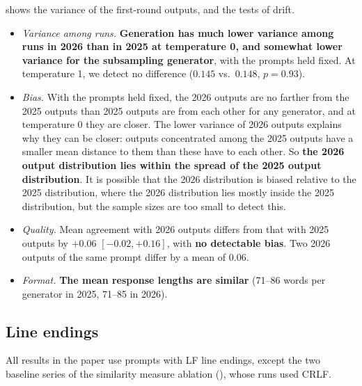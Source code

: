 \documentclass[letterpaper]{article} %
\begin{document}
 shows the variance of the first-round outputs, and  the tests of drift.
\begin{itemize}
    \item \emph{Variance among runs.}
    \textbf{Generation has much lower variance among runs in 2026 than in 2025 at temperature 0, and somewhat lower variance for the subsampling generator}, with the prompts held fixed.
    At temperature 1, we detect no difference (\(0.145\) vs.\ \(0.148\), \(p = 0.93\)).
    \item \emph{Bias.}
    With the prompts held fixed, the 2026 outputs are no farther from the 2025 outputs than 2025 outputs are from each other for any generator, and at temperature 0 they are closer.
    The lower variance of 2026 outputs explains why they can be closer: outputs concentrated among the 2025 outputs have a smaller mean distance to them than these have to each other.
    So \textbf{the 2026 output distribution lies within the spread of the 2025 output distribution}.
    It is possible that the 2026 distribution is biased relative to the 2025 distribution, where the 2026 distribution lies mostly inside the 2025 distribution, but the sample sizes are too small to detect this.
    \item \emph{Quality.}
    Mean agreement with 2026 outputs differs from that with 2025 outputs by \(+0.06\) \([-0.02, +0.16]\), with \textbf{no detectable bias}.
    Two 2026 outputs of the same prompt differ by a mean of \(0.06\).
    \item \emph{Format.}
    \textbf{The mean response lengths are similar} (71--86 words per generator in 2025, 71--85 in 2026).
\end{itemize}

\subsection{Line endings}
\label{app:line-endings}

All results in the paper use prompts with LF line endings, except the two baseline series of the similarity measure ablation (), whose runs used CRLF.
\end{document}
